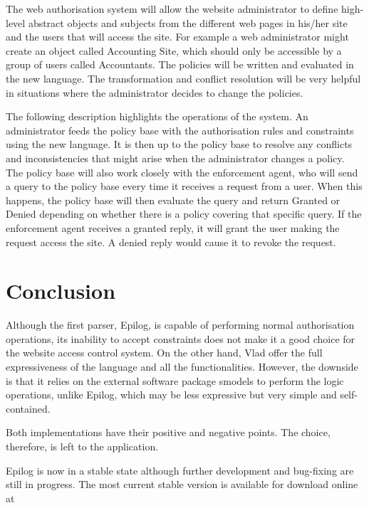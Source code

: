 \documentclass[a4paper,draft]{article}
\begin{document}
      The web authorisation system will allow the website administrator to
      define high-level abstract objects and subjects from the different web
      pages in his/her site and the users that will access the site. For
      example a web administrator might create an object called Accounting
      Site, which should only be accessible by a group of users called
      Accountants. The policies will be written and evaluated in the new
      language. The transformation and conflict resolution will be very
      helpful in situations where the administrator decides to change
      the policies.

      The following description highlights the operations of the system. 
      An administrator feeds the policy base with the authorisation rules
      and constraints using the new language. It is then up to the policy
      base to resolve any conflicts and inconsistencies that might arise
      when the administrator changes a policy. The policy base will also
      work closely with the enforcement agent, who will send a query to
      the policy base every time it receives a request from a user. When
      this happens, the policy base will then evaluate the query and return
      Granted or Denied depending on whether there is a policy covering
      that specific query. If the enforcement agent receives a granted 
      reply, it will grant the user making the request access the site.
      A denied reply would cause it to revoke the request.

    \pagebreak

  \section{Conclusion}

    Although the first parser, Epilog, is capable of performing normal 
    authorisation operations, its inability to accept constraints does not
    make it a good choice for the website access control system. On the
    other hand, Vlad offer the full expressiveness of the language and all
    the functionalities. However, the downside is that it relies on the
    external software package smodels to perform the logic operations, unlike
    Epilog, which may be less expressive but very simple and self-contained.

    Both implementations have their positive and negative points. The choice,
    therefore, is left to the application.

    Epilog is now in a stable state although further development and
    bug-fixing are still in progress. The most current stable version 
    is available for download online at
\end{document}

